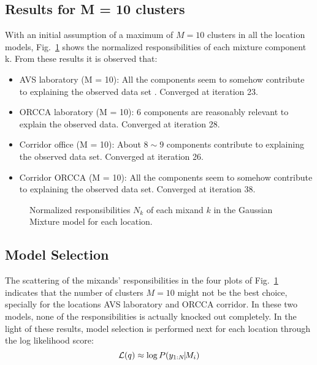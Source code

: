 \subsection{Results for M = 10 clusters}
With an initial assumption of a  maximum of $M=10$ clusters in all the location models, 
Fig.~\ref{fig:Responsibilities_M10} shows the normalized responsibilities of each mixture component k. 
From these results it is observed that: 
\begin{itemize}
	\item{AVS laboratory (M = 10): }
	All the components seem to somehow contribute to explaining the observed data set . 
	Converged at iteration 23.
	\item{ORCCA laboratory (M = 10): }
	$6$ components are reasonably relevant to explain the observed data. 
	Converged at iteration 28.
	\item{Corridor office (M = 10): }
	About $8\sim9$ components contribute to explaining the observed data set.
	Converged at iteration 26.
	\item{Corridor ORCCA (M = 10): }
	All the components seem to somehow contribute to explaining the observed data set. 
	Converged at iteration 38.
\end{itemize}
\begin{figure}[!h]
	\centering
	\caption{Normalized responsibilities $N_k$ of each mixand $k$ in the Gaussian Mixture model for each location.}
	\label{fig:Responsibilities_M10}
\end{figure}

\break
\newpage
\subsection{Model Selection}
The scattering of the mixands' responsibilities in the four plots of Fig.~\ref{fig:Responsibilities_M10} indicates that 
the number of clusters $M=10$ might not be the best choice, specially for the locations 
AVS laboratory and ORCCA corridor. In these two models, none of the responsibilities is actually knocked out completely. 
In the light of these results,   model selection is performed next for each location 
through the log likelihood score:%
\begin{equation}
	\mathcal{L}(q) \approx \log P(y_{1:N} \vline M_i)
\end{equation}

